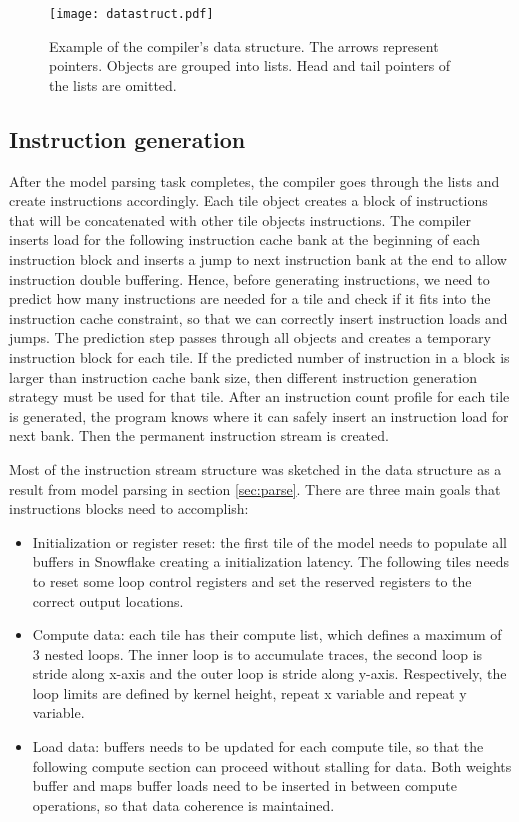 \documentclass{sig-alternate}
\begin{document}
\begin{figure}[ht]
  \centering
  \texttt{[image: datastruct.pdf]}
  \caption{Example of the compiler's data structure. The arrows represent pointers. Objects are grouped into lists. Head and tail pointers of the lists are omitted.}
  \label{fig:datastruct}
\end{figure}

\subsection{Instruction generation}
After the model parsing task completes, the compiler goes through the lists and create instructions accordingly. Each tile object creates a block of instructions that will be concatenated with other tile objects instructions. The compiler inserts load for the following instruction cache bank at the beginning of each instruction block and inserts a jump to next instruction bank at the end to allow instruction double buffering. Hence, before generating instructions, we need to predict how many instructions are needed for a tile and check if it fits into the instruction cache constraint, so that we can correctly insert instruction loads and jumps. The prediction step passes through all objects and creates a temporary instruction block for each tile. If the predicted number of instruction in a block is larger than instruction cache bank size, then different instruction generation strategy must be used for that tile. After an instruction count profile for each tile is generated, the program knows where it can safely insert an instruction load for next bank. Then the permanent instruction stream is created.

Most of the instruction stream structure was sketched in the data structure as a result from model parsing in section \ref{sec:parse}. There are three main goals that instructions blocks need to accomplish:

\begin{itemize}
\item Initialization or register reset: the first tile of the model needs to populate all buffers in Snowflake creating a initialization latency. The following tiles needs to reset some loop control registers and set the reserved registers to the correct output locations.
\item Compute data: each tile has their compute list, which defines a maximum of $3$ nested loops. The inner loop is to accumulate traces, the second loop is stride along x-axis and the outer loop is stride along y-axis. Respectively, the loop limits are defined by kernel height, repeat x variable and repeat y variable. 
\item Load data: buffers needs to be updated for each compute tile, so that the following compute section can proceed without stalling for data. Both weights buffer and maps buffer loads need to be inserted in between compute operations, so that data coherence is maintained. 
\end{itemize}
\end{document}
